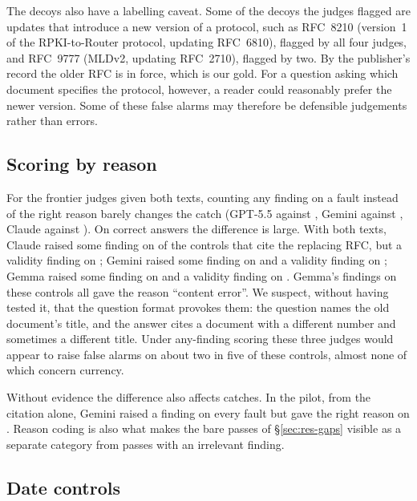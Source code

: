 The decoys also have a labelling caveat. Some of the decoys the judges flagged are updates that introduce a new version of a
protocol, such as RFC~8210 (version~1 of the RPKI-to-Router protocol, updating RFC~6810), flagged by all four judges,
and RFC~9777 (MLDv2, updating RFC~2710), flagged by two. By the publisher's record the older RFC is in force, which is our gold. For a
question asking which document specifies the protocol, however, a reader could reasonably prefer the newer version.
Some of these false alarms may therefore be defensible judgements rather than errors.

\subsection{Scoring by reason}
\label{sec:res-scoring}

For the frontier judges given both texts, counting any finding on a fault instead of the right reason barely changes
the catch (GPT-5.5 \EGPTCatchTexts{} against \EGPTCatchAnyTexts, Gemini \EGeminiCatchTexts{} against \EGeminiCatchAnyTexts,
Claude \EOpusCatchTexts{} against \EOpusCatchAnyTexts). On correct answers the difference is large. With both texts, Claude raised some finding on
\EOpusCtrlAnyTexts{} of the controls that cite the replacing RFC, but a validity finding on \EOpusCtrlFATexts; Gemini
raised some finding on \EGeminiCtrlAnyTexts{} and a validity finding on \EGeminiCtrlFATexts; Gemma raised some finding on \EGemmaCtrlAnyTexts{} and a validity finding on \EGemmaCtrlFATexts. Gemma's findings on these
controls all gave the reason ``content error''. We suspect, without having tested it, that the question format provokes
them: the question names the old document's title, and the answer cites a document with a different number and
sometimes a different title. Under any-finding scoring these three judges would appear to raise false alarms on about two in
five of these controls, almost none of which concern currency.

Without evidence the difference also affects catches. In the pilot, from the citation alone, Gemini raised a finding on
every fault but gave the right reason on \RfcCatchCiteOnlyGeminiThreeOnePro. Reason coding is also what makes the bare
passes of \S\ref{sec:res-gaps} visible as a separate category from passes with an irrelevant finding.

\subsection{Date controls}
\label{sec:res-dates}

